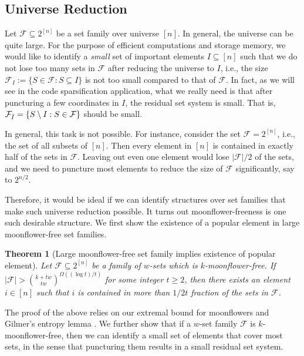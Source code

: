\documentclass{article}
\newtheorem{theorem}{Theorem}[section]
\newcommand{\<}{\langle}
\renewcommand{\>}{\rangle}
\newcommand{\calF}{\mathcal{F}}
\begin{document}
\subsection{Universe Reduction}

Let $\calF \subseteq 2^{[n]}$ be a set family over universe $[n]$. In general, the universe can be quite large. For the purpose of efficient computations and storage memory, we would like to identify a \emph{small} set of important elements $I \subseteq [n]$ such that we do not lose too many sets in $\calF$ after reducing the universe to $I$, i.e., the size $\calF_I:= \{S \in \calF: S \subseteq I\}$ is not too small compared to that of $\calF$. In fact, as we will see in the code sparsification application, what we really need is that after puncturing a few coordinates in $I$, the residual set system is small. That is, $\calF_{\Bar{I}}=\{S \setminus I: S \in \calF\}$ should be small.

In general, this task is not possible. For instance, consider the set $\calF = 2^{[n]}$, i.e., the set of all subsets of $[n]$. Then every element in $[n]$ is contained in exactly half of the sets in $\calF$. Leaving out even one element would lose $|\calF| / 2$ of the sets, and we need to puncture most elements to reduce the size of $\calF$ significantly, say to $2^{n/2}$.

Therefore, it would be ideal if we can identify structures over set families that make such universe reduction possible. It turns out moonflower-freeness is one such desirable structure. We first show the existence of a popular element in large moonflower-free set families.

\begin{theorem}[Large moonflower-free set family implies existence of popular element]\label{thm:large_family_size_implies_existence_of_popular_element}
   Let $\calF \subseteq 2^{[n]}$ be a family of $w$-sets which is $k$-moonflower-free. If $|\calF| > {\binom{k+tw}{tw}}^{\Omega((\log t)/t)}$ for some integer $t \geq 2$, then there exists an element $i \in [n]$ such that $i$ is contained in more than $1/2t$ fraction of the sets in $\calF$.
\end{theorem}

The proof of the above relies on our extremal bound for moonflowers and Gilmer's entropy lemma \cite{Gil22}. We further show that if a $w$-set family $\calF$ is $k$-moonflower-free, then we can identify a small set of elements that cover most sets, in the sense that puncturing them results in a small residual set system.
\end{document}
